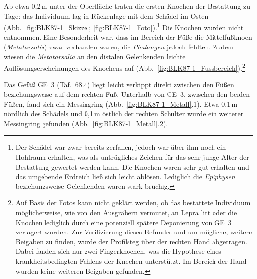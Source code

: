 \begin{table}[tb!]
	\centering
	\begin{minipage}[b]{\columnwidth}
		\centering
		{\footnotesize }\vspace{1.5em}
		\caption{BLK~87/1: Anteil verschiedener Fundmaterialien.}
		\label{tab:BLK87-1_Funde}
	\end{minipage}%
	\hfill
	\begin{minipage}[b]{\columnwidth}
		\centering
		{\footnotesize }
		\caption{BLK 87/1: Keramische Stilgruppen.}
		\label{fig:BLK87-1_Keramik_StilGr}
	\end{minipage}
\end{table}

Ab etwa 0,2\,m unter der Oberfläche traten die ersten Knochen der Bestattung zu Tage: das Individuum lag in Rückenlage mit dem Schädel im Osten (Abb.~\ref{fig:BLK87-1_Skizze}; \ref{fig:BLK87-1_Foto}).\footnote{Der Schädel war zwar bereits zerfallen, jedoch war über ihm noch ein Hohlraum erhalten, was als untrügliches Zeichen für das sehr junge Alter der Bestattung gewertet werden kann. Die Knochen waren sehr gut erhalten und das umgebende Erdreich ließ sich leicht ablösen. Lediglich die \textit{Epiphysen} beziehungsweise Gelenkenden waren stark brüchig.} Die Knochen wurden nicht entnommen. Eine Besonderheit war, dass im Bereich der Füße die Mittelfußknoen (\textit{Metatarsalia}) zwar vorhanden waren, die \textit{Phalangen} jedoch fehlten. Zudem wiesen die \textit{Metatarsalia} an den distalen Gelenkenden leichte Auflösungserscheinungen des Knochens auf (Abb.~\ref{fig:BLK87-1_Fussbereich}).\footnote{Auf Basis der Fotos kann nicht geklärt werden, ob das bestattete Individuum möglicherweise, wie von den Ausgräbern vermutet, an Lepra litt oder die Knochen lediglich durch eine potenziell spätere Deponierung von GE~3 verlagert wurden. Zur Verifizierung dieses Befundes und um mögliche, weitere Beigaben zu finden, wurde der Profilsteg über der rechten Hand abgetragen. Dabei fanden sich nur zwei Fingerknochen, was die Hypothese eines krankheitsbedingten Fehlens der Knochen unterstützt. Im Bereich der Hand wurden keine weiteren Beigaben gefunden.\label{ftn:BLK87-1_Lepra}}

Das Gefäß GE~3 (Taf.~68.4) liegt leicht verkippt direkt zwischen den Füßen beziehungsweise auf dem rechten Fuß. Unterhalb von GE~3, zwischen den beiden Füßen, fand sich ein Messingring (Abb.~\ref{fig:BLK87-1_Metall}.1). Etwa 0,1\,m nördlich des Schädels und 0,1\,m östlich der rechten Schulter wurde ein weiterer Messingring gefunden (Abb.~\ref{fig:BLK87-1_Metall}.2).

